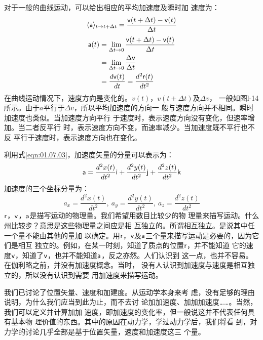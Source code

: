 对于一般的曲线运动，可以给出相应的平均加速度及瞬时加
速度为：
\begin{equation}\label{01.08.02}
    \langle {\sf a} \rangle_{t \rightarrow t+\Delta t} = \frac{{\sf v}(t+\Delta t)-{\sf v}(t)}{\Delta t}
\end{equation}
\begin{equation}\label{01.08.03}
    \begin{aligned}
        {\sf a}(t) & =\lim _{\Delta t \rightarrow 0} \frac{{\sf v}(t+\Delta t)-{\sf v}(t)}{\Delta t} \\
                  & =\lim_{\Delta t \rightarrow 0}\frac{\Delta {\sf v}}{\Delta t}                  \\
                  & =\frac{d{\sf v}(t)}{dt}=\frac{d^2 {\sf r}(t)}{d t^2}
    \end{aligned}
\end{equation}
在曲线运动情况下，速度方向是变化的。$v(t)$，$v(t+\Delta t)$及$\Delta v$，
一般如图l-14所示。由于$a$平行于$\Delta v$，所以平均加速度的方向一
般与速度方向并不相同。瞬时加速度也类似。当加速度方向平行
于速度时，表示速度方向没有变化，但速率增加。当二者反平行
时，表示速度方向不变，而速率减少。当加速度既不平行也不反
平行于速度时，表示速度方向也在变化。

利用式\eqref{eqn:01.07.03}，加速度矢量的分量可以表示为：
\begin{equation}\label{eqn:01.08.04}
    {\sf a}=\frac{d^2x(t)}{dt^2}{\sf i}+\frac{d^2y(t)}{dt^2}{\sf j}+\frac{d^2z(t)}{dt^2}{\sf k}
\end{equation}
加速度的三个坐标分量为：
\begin{equation}\label{eqn:01.08.05}
    a_x=\frac{d^2x(t)}{dt^2},~ a_y=\frac{d^2y(t)}{dt^2},~
    a_z=\frac{d^2z(t)}{dt^2}
\end{equation}
${\sf r}$，${\sf v}$，${\sf a}$是描写运动的物理量。我们希望用数目比较少的物
理量来描写运动。什么州比较步？意思是这些物理量之间应是相
互独立的。所谓相互独立。是说其中任一个量不能由其他的量加
以确定。用${\sf r}$，${\sf v}$及${\sf a}$三个量来描写运动是必要的，因为它们是相互
独立的。例如，在某一时刻，知道了质点的位置${\sf r}$，并不能知道
它的速度${\sf v}$，知道了${\sf v}$，也并不能知道${\sf a}$，反之亦然。人们认识到
这一点，也并不容易。在伽利略之前，并没有加速度概念。当时，
没有人认识到加速度与速度是相互独立的，所以没有认识到需要
用加速度来描写运动。

我们已讨论了位置矢量、速度和加建度。从运动学本身来考
虑，没有足够的理由说明，为什么我们应当到此为止，而不去讨
论加加速度、加加加速度……。当然，我们可以定义并计算加加
速度，即加速度的变化率，但一般说这并不代表任何具有基本物
理价值的东西。其中的原因在动力学，学过动力学后，我们将看
到，对力学的讨论几乎全部是基于位置矢量，速度和加速度这三
个量。

